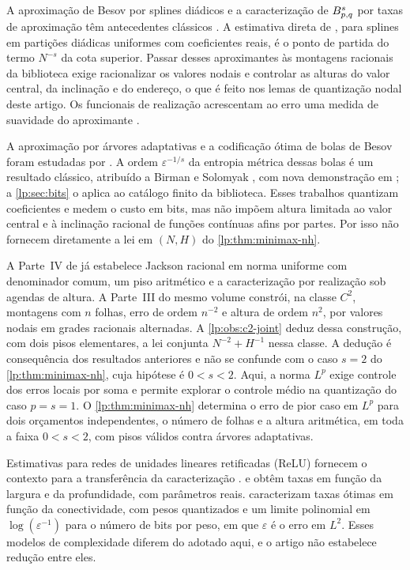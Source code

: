 \documentclass[12pt,a4paper]{article}
\begin{document}
A aproximação de Besov por splines diádicos e a caracterização de $B^{s}_{p,q}$ por taxas de aproximação têm antecedentes clássicos \citep{artigo_1-devore1998,artigo_2-devorepopov1988,artigo_2-devorepopov1988b,artigo_2-petrushev1988,lp-petrushevpopov1987}. A estimativa direta de \citet{artigo_2-devorepopov1988}, para splines em partições diádicas uniformes com coeficientes reais, é o ponto de partida do termo $N^{-s}$ da cota superior. Passar desses aproximantes às montagens racionais da biblioteca exige racionalizar os valores nodais e controlar as alturas do valor central, da inclinação e do endereço, o que é feito nos lemas de quantização nodal deste artigo. Os funcionais de realização acrescentam ao erro uma medida de suavidade do aproximante \citep{lp-ditzian2007,artigo_2-hristovivanov1990,lp-kolomoitsev2019}.\par A aproximação por árvores adaptativas e a codificação ótima de bolas de Besov foram estudadas por \citet{lp-cohen2001}. A ordem $\varepsilon^{-1/s}$ da entropia métrica dessas bolas é um resultado clássico, atribuído a Birman e Solomyak \citep{lp-birmansolomyak1967}, com nova demonstração em \citet{lp-kerkyacharianpicard2003}; a \cref{lp:sec:bits} o aplica ao catálogo finito da biblioteca. Esses trabalhos quantizam coeficientes e medem o custo em bits, mas não impõem altura limitada ao valor central e à inclinação racional de funções contínuas afins por partes. Por isso não fornecem diretamente a lei em $(N,H)$ do \cref{lp:thm:minimax-nh}.\par A Parte~IV de \citet{lp-oliveiravol} já estabelece Jackson racional em norma uniforme com denominador comum, um piso aritmético e a caracterização por realização sob agendas de altura. A Parte~III do mesmo volume constrói, na classe $C^2$, montagens com $n$ folhas, erro de ordem $n^{-2}$ e altura de ordem $n^2$, por valores nodais em grades racionais alternadas. A \cref{lp:obs:c2-joint} deduz dessa construção, com dois pisos elementares, a lei conjunta $N^{-2}+H^{-1}$ nessa classe. A dedução é consequência dos resultados anteriores e não se confunde com o caso $s=2$ do \cref{lp:thm:minimax-nh}, cuja hipótese é $0<s<2$. Aqui, a norma $L^p$ exige controle dos erros locais por soma e permite explorar o controle médio na quantização do caso $p=s=1$. O \cref{lp:thm:minimax-nh} determina o erro de pior caso em $L^p$ para dois orçamentos independentes, o número de folhas e a altura aritmética, em toda a faixa $0<s<2$, com pisos válidos contra árvores adaptativas.\par Estimativas para redes de unidades lineares retificadas (ReLU) fornecem o contexto para a transferência da caracterização \citep{lp-ali2020,artigo_1-devore2021}. \citet{lp-siegel2023} e \citet{lp-yang2024} obtêm taxas em função da largura e da profundidade, com parâmetros reais. \citet{lp-elbrachter2021} caracterizam taxas ótimas em função da conectividade, com pesos quantizados e um limite polinomial em $\log(\varepsilon^{-1})$ para o número de bits por peso, em que $\varepsilon$ é o erro em $L^2$. Esses modelos de complexidade diferem do adotado aqui, e o artigo não estabelece redução entre eles.
\end{document}
